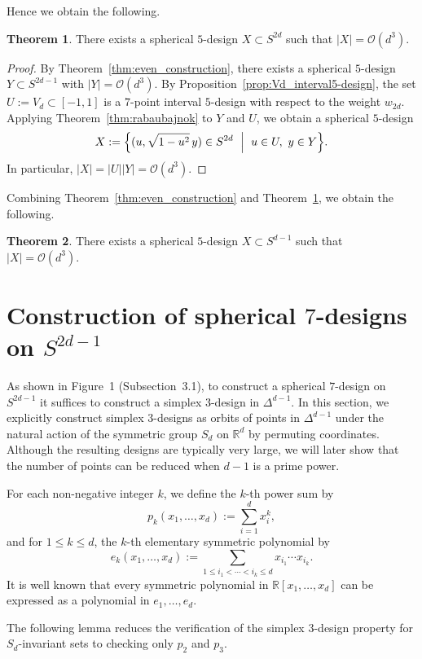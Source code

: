 \documentclass{amsart}
\theoremstyle{definition}
\newtheorem{theorem}{Theorem}[section]
\theoremstyle{remark}
\numberwithin{equation}{section}
\newcommand{\R}{{\mathbb R}}
\begin{document}
Hence we obtain the following.

\begin{theorem}\label{thm:odd_construction}
There exists a spherical $5$-design $X\subset S^{2d}$ such that
\(
|X|=\mathcal O(d^3).
\)
\end{theorem}

\begin{proof}
By Theorem~\ref{thm:even_construction}, there exists a spherical $5$-design
$Y\subset S^{2d-1}$ with $|Y|=\mathcal O(d^3)$.
By Proposition~\ref{prop:Vd_interval5-design}, the set $U:=V_d\subset[-1,1]$ is a $7$-point interval $5$-design with respect to the weight $w_{2d}$.
Applying Theorem~\ref{thm:rabaubajnok} to $Y$ and $U$, we obtain a spherical $5$-design
\[
X:=\Bigl\{(u,\sqrt{1-u^2}\,y)\in S^{2d}\ \Bigm|\ u\in U,\ y\in Y\Bigr\}.
\]
In particular, $|X|=|U||Y|=\mathcal O(d^3)$.
\end{proof}

Combining Theorem~\ref{thm:even_construction} and Theorem~\ref{thm:odd_construction}, we obtain the following.

\begin{theorem}
There exists a spherical $5$-design $X\subset S^{d-1}$ such that
\(
|X|=\mathcal O(d^3).
\)
\end{theorem}

\section{Construction of spherical $7$-designs on $S^{2d-1}$}
As shown in Figure~1 (Subsection~3.1), to construct a spherical $7$-design on $S^{2d-1}$ it suffices to construct a simplex $3$-design in $\Delta^{d-1}$.
In this section, we explicitly construct simplex $3$-designs as orbits of points in $\Delta^{d-1}$ under the natural action of the symmetric group $S_d$ on $\R^d$ by permuting coordinates.
Although the resulting designs are typically very large, we will later show that the number of points can be reduced when $d-1$ is a prime power.

For each non-negative integer $k$, we define the $k$-th power sum by
\[
p_k(x_1,\dots,x_d):=\sum_{i=1}^d x_i^k,
\]
and for $1\le k\le d$, the $k$-th elementary symmetric polynomial by
\[
e_k(x_1,\dots,x_d):=\sum_{1\le i_1<\cdots<i_k\le d} x_{i_1}\cdots x_{i_k}.
\]
It is well known that every symmetric polynomial in $\R[x_1,\dots,x_d]$ can be expressed as a polynomial in $e_1,\dots,e_d$.

The following lemma reduces the verification of the simplex $3$-design property for $S_d$-invariant sets to checking only $p_2$ and $p_3$.
\end{document}
